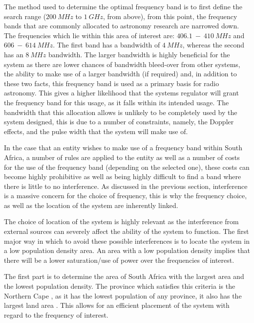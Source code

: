 \documentclass[11pt]{witseiepaper}
\begin{document}
The method used to determine the optimal frequency band is to first define the search range ($200~MHz$ to $1~GHz$, from above), from this point, the frequency bands that are commonly allocated to astronomy research are narrowed down. The frequencies which lie within this area of interest are: $406.1~-~410~MHz$ and $606~-~614~MHz$. 
The first band has a bandwidth of $4~MHz$, whereas the second has an $8~MHz$ bandwidth. The larger bandwidth is highly beneficial for the system as there are lower chances of bandwidth bleed-over from other systems, the ability to make use of a larger bandwidth (if required) and, in addition to these two facts, this frequency band is used as a primary basis for radio astronomy.
This gives a higher likelihood that the systems regulator will grant the frequency band for this usage, as it falls within its intended usage.
The bandwidth that this allocation allows is unlikely to be completely used by the system designed, this is due to a number of constraints, namely, the Doppler effects, and the pulse width that the system will make use of.

In the case that an entity wishes to make use of a frequency band within South Africa, a number of rules are applied to the entity as well as a number of costs for the use of the frequency band (depending on the selected one), these costs can become highly prohibitive as well as being highly difficult to find a band where there is little to no interference.
As discussed in the previous section, interference is a massive concern for the choice of frequency, this is why the frequency choice, as well as the location of the system are inherently linked.


The choice of location of the system is highly relevant as the interference from external sources can severely affect the ability of the system to function. The first major way in which to avoid these possible interferences is to locate the system in a low population density area. An area with a low population density implies that there will be a lower saturation/use of power over the frequencies of interest.

The first part is to determine the area of South Africa with the largest area and the lowest population density. The province which satisfies this criteria is the Northern Cape \cite[p.~18]{statsSASurvey1}, as it has the lowest population of any province, it also has the largest land area \cite[p.~9,15]{statsSASurvey2}. This allows for an efficient placement of the system with regard to the frequency of interest.
\end{document}
